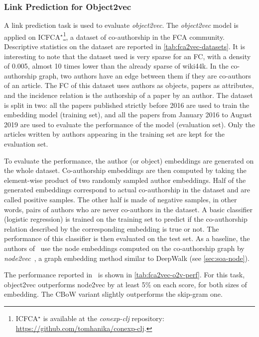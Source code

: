\subsubsection{Link Prediction for Object2vec\label{sec:fca2vec-link}}
A link prediction task is used to evaluate \textit{object2vec}.
The \textit{object2vec} model is applied on ICFCA$^\star$\footnote{ICFCA$^\star$ is available at the \textit{conexp-clj} repository: \url{https://github.com/tomhanika/conexp-clj}.}, a dataset of co-authorship in the FCA community. Descriptive statistics on the dataset are reported in \cref{tab:fca2vec-datasets}.
It is interesting to note that the dataset used is very sparse for an FC, with a density of 0.005, almost 10 times lower than the already sparse of wiki44k.
In the co-authorship graph, two authors have an edge between them if they are co-authors of an article.
The FC of this dataset uses authors as objects, papers as attributes, and the incidence relation is the authorship of a paper by an author.
The dataset is split in two: all the papers published strictly before 2016 are used to train the embedding model (training set), and all the papers from January 2016 to August 2019 are used to evaluate the performance of the model (evaluation set). Only the articles written by authors appearing in the training set are kept for the evaluation set.

To evaluate the performance, the author (or object) embeddings are generated on the whole dataset.
Co-authorship embeddings are then computed by taking the element-wise product of two randomly sampled author embeddings.
Half of the generated embeddings correspond to actual co-authorship in the dataset and are called positive samples.
The other half is made of negative samples, in other words, pairs of authors who are never co-authors in the dataset.
A basic classifier (logistic regression) is trained on the training set to predict if the co-authorship relation described by the corresponding embedding is true or not.
The performance of this classifier is then evaluated on the test set.
As a baseline, the authors of~\cite{fca2vec:2019:durrschnabel} use the node embeddings computed on the co-authorship graph by \textit{node2vec}~\cite{node2vec:2016:grover}, a graph embedding method similar to DeepWalk (see \cref{sec:soa-node}).

The performance reported in~\cite{fca2vec:2019:durrschnabel} is shown in \cref{tab:fca2vec-o2v-perf}.
For this task, {object2vec} outperforms {node2vec} by at least 5\% on each score, for both sizes of embedding.
The CBoW variant slightly outperforms the skip-gram one.


